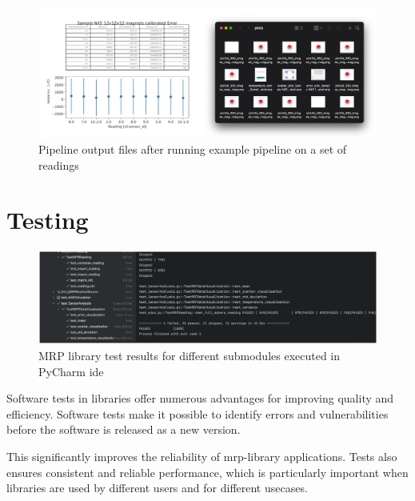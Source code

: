 \begin{figure}
\centering
\includegraphics{./generated_images/border_Pipeline_output_files_after_running_example_pipeline_on_a_set_of_readings.png}
\caption{Pipeline output files after running example pipeline on a set
of readings
\label{Pipeline_output_files_after_running_example_pipeline_on_a_set_of_readings.png}}
\end{figure}

\hypertarget{testing}{%
\section{Testing}\label{testing}}

\begin{figure}
\centering
\includegraphics{./generated_images/border_MRP_library_test_results_for_different_submodules_executed_in_PyCharm_(+ide).png}
\caption{MRP library test results for different submodules executed in
PyCharm \gls{ide}
\label{MRP_library_test_results_for_different_submodules_executed_in_PyCharm_(+ide).png}}
\end{figure}

Software tests in libraries offer numerous advantages for improving
quality and efficiency. Software tests make it possible to identify
errors and vulnerabilities before the software is released as a new
version.

This significantly improves the reliability of \gls{mrp}-library
applications. Tests also ensures consistent and reliable performance,
which is particularly important when libraries are used by different
users and for different usecases.

